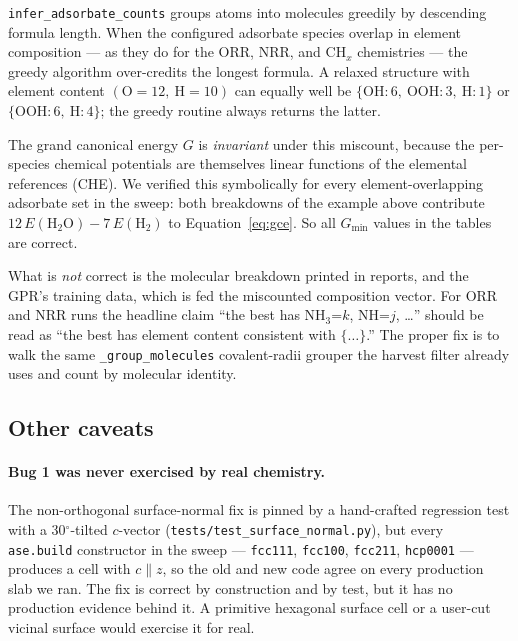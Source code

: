 \documentclass[11pt,letterpaper]{article}
\begin{document}
\begin{limitations}
\label{sec:limitations}
\texttt{infer\_adsorbate\_counts} groups atoms into molecules greedily
by descending formula length. When the configured adsorbate species
overlap in element composition — as they do for the ORR, NRR, and
CH$_x$ chemistries — the greedy algorithm over-credits the longest
formula. A relaxed structure with element content
$(\text{O}{=}12,\ \text{H}{=}10)$ can equally well be
$\{\text{OH}{:}6,\ \text{OOH}{:}3,\ \text{H}{:}1\}$ or
$\{\text{OOH}{:}6,\ \text{H}{:}4\}$; the greedy routine always
returns the latter.

The grand canonical energy $G$ is \emph{invariant} under this
miscount, because the per-species chemical potentials are themselves
linear functions of the elemental references (CHE). We verified
this symbolically for every element-overlapping adsorbate set in the
sweep: both breakdowns of the example above contribute
$12\,E(\text{H}_2\text{O}) - 7\,E(\text{H}_2)$ to
Equation~\ref{eq:gce}. So all $G_{\min}$ values in the tables are
correct.

What is \emph{not} correct is the molecular breakdown printed in
reports, and the GPR's training data, which is fed the miscounted
composition vector. For ORR and NRR runs the headline claim
``the best has NH$_3$=$k$, NH=$j$, …'' should be read as ``the best
has element content consistent with $\{\ldots\}$.'' The proper fix is
to walk the same \texttt{\_group\_molecules} covalent-radii grouper
the harvest filter already uses and count by molecular identity.
\end{limitations}

\subsection{Other caveats}

\paragraph{Bug 1 was never exercised by real chemistry.}
The non-orthogonal surface-normal fix is pinned by a hand-crafted
regression test with a 30$^\circ$-tilted $c$-vector
(\texttt{tests/test\_surface\_normal.py}), but every
\texttt{ase.build} constructor in the sweep —
\texttt{fcc111}, \texttt{fcc100}, \texttt{fcc211}, \texttt{hcp0001} —
produces a cell with $c \parallel z$, so the old and new code agree
on every production slab we ran. The fix is correct by
construction and by test, but it has no production evidence behind
it. A primitive hexagonal surface cell or a user-cut vicinal surface
would exercise it for real.
\end{document}
